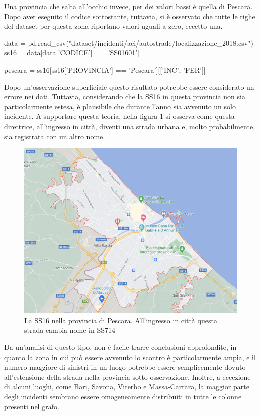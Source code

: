 \documentclass[a4paper,12pt]{report}
\begin{document}
Una provincia che salta all'occhio invece, per dei valori bassi è quella di Pescara. 
Dopo aver eseguito il codice sottostante, tuttavia, si è osservato che tutte le righe 
del dataset per questa zona riportano valori uguali a zero, eccetto una. 

\begin{code}
data = pd.read_csv("dataset/incidenti/aci/autostrade/localizzazione_2018.csv")
ss16 = data[data['CODICE'] == 'SS01601']

pescara = ss16[ss16['PROVINCIA'] == 'Pescara'][['INC', 'FER']]
\end{code}

Dopo un'osservazione superficiale questo risultato potrebbe 
essere considerato un errore nei dati. 
Tuttavia, considerando che la SS16 in questa provincia non 
sia particolarmente estesa, è plausibile che durante l'anno sia avvenuto un solo incidente. 
A supportare questa teoria, nella figura \ref{fig:ss16-pescara} si osserva come 
questa direttrice, all'ingresso in città, diventi una strada urbana e, molto probabilmente, 
sia registrata con un altro nome. 

\begin{figure}
    \hfill\includegraphics[width=0.7\linewidth]{img/pescara_ss16.png}\hspace*{\fill}
    \caption{La SS16 nella provincia di Pescara. All'ingresso in città questa strada cambia nome in SS714}
    \label{fig:ss16-pescara}
\end{figure}

Da un'analisi di questo tipo, non è facile trarre conclusioni approfondite, in quanto la 
zona in cui può essere avvenuto lo scontro è particolarmente ampia, 
e il numero maggiore di sinistri in un luogo potrebbe essere semplicemente 
dovuto all'estensione della strada nella provincia sotto osservazione. 
Inoltre, a eccezione di alcuni luoghi, come Bari, Savona, Viterbo e Massa-Carrara, 
la maggior parte degli incidenti sembrano essere omogeneamente distribuiti 
in tutte le colonne presenti nel grafo. 
\end{document}
